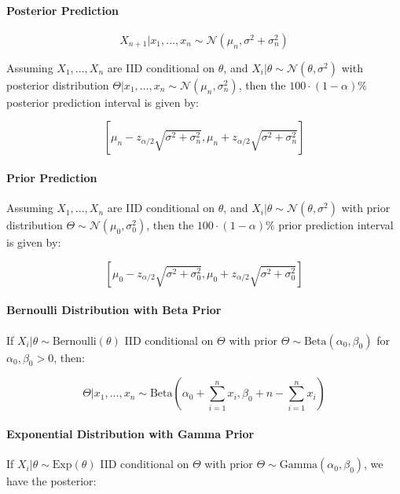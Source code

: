 \documentclass[a4paper]{article}
\begin{document}
            \paragraph{Posterior Prediction}
                \[
                    X_{n+1} | x_1, ..., x_n \sim \mathcal{N}(\mu_n, \sigma^2 +
                    \sigma_n^2)
                \]

                Assuming $X_1, ..., X_n$ are IID conditional on $\theta$, and
                $X_i | \theta \sim \mathcal{N}(\theta, \sigma^2)$ with posterior
                distribution $\Theta | x_1, ..., x_n \sim \mathcal{N}(\mu_n,
                \sigma_n^2)$, then the $100 \cdot (1 - \alpha)\%$ posterior
                prediction interval is given by:

                \[
                    \left[\mu_n - z_{\alpha/2} \sqrt{\sigma^2 + \sigma_n^2},
                    \mu_n + z_{\alpha/2} \sqrt{\sigma^2 + \sigma_n^2}\right]
                \]

            \paragraph{Prior Prediction}
                Assuming $X_1, ..., X_n$ are IID conditional on $\theta$, and
                $X_i | \theta \sim \mathcal{N}(\theta, \sigma^2)$ with prior
                distribution $\Theta \sim \mathcal{N}(\mu_0, \sigma_0^2)$, then
                the $100 \cdot (1 - \alpha)\%$ prior prediction interval is
                given by:

                \[
                    \left[\mu_0 - z_{\alpha/2}\sqrt{\sigma^2 + \sigma_0^2},
                    \mu_0 + z_{\alpha/2}\sqrt{\sigma^2 + \sigma_0^2}\right]
                \]

            \paragraph{Bernoulli Distribution with Beta Prior}
                If $X_i | \theta \sim \text{Bernoulli}(\theta)$ IID conditional
                on $\Theta$ with prior $\Theta \sim \text{Beta}(\alpha_0,
                \beta_0)$ for $\alpha_0, \beta_0 > 0$, then:

                \[
                    \Theta | x_1, ..., x_n \sim \text{Beta}\left(\alpha_0 +
                    \sum_{i=1}^n x_i, \beta_0 + n - \sum_{i=1}^n x_i\right)
                \]

            \paragraph{Exponential Distribution with Gamma Prior}
                If $X_i | \theta \sim \text{Exp}(\theta)$ IID conditional on
                $\Theta$ with prior $\Theta \sim \text{Gamma}(\alpha_0,
                \beta_0)$, we have the posterior:
\end{document}
